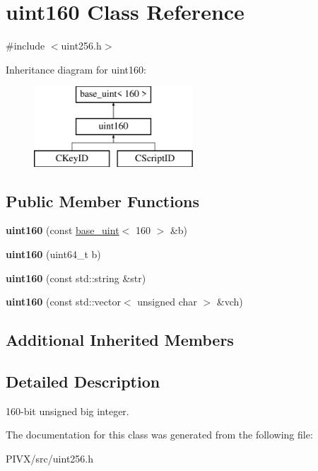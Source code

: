 \hypertarget{classuint160}{}\section{uint160 Class Reference}
\label{classuint160}


{\ttfamily \#include $<$uint256.\+h$>$}

Inheritance diagram for uint160\+:\begin{figure}[H]
\begin{center}
\leavevmode
\includegraphics[height=3.000000cm]{classuint160}
\end{center}
\end{figure}
\subsection*{Public Member Functions}
\begin{DoxyCompactItemize}
\item 
\mbox{\label{classuint160_ae0ba03a9f6b06af48b44963b3d32c2bd}} 
{\bfseries uint160} (const \mbox{\hyperlink{classbase__uint}{base\+\_\+uint}}$<$ 160 $>$ \&b)
\item 
\mbox{\label{classuint160_a1b4399cc586066b0c61401921be5d041}} 
{\bfseries uint160} (uint64\+\_\+t b)
\item 
\mbox{\label{classuint160_a17be565c999f678e47d12e694446e0c4}} 
{\bfseries uint160} (const std\+::string \&str)
\item 
\mbox{\label{classuint160_a92bd85c77e73d6642f9bb7519cbd480c}} 
{\bfseries uint160} (const std\+::vector$<$ unsigned char $>$ \&vch)
\end{DoxyCompactItemize}
\subsection*{Additional Inherited Members}


\subsection{Detailed Description}
160-\/bit unsigned big integer. 

The documentation for this class was generated from the following file\+:\begin{DoxyCompactItemize}
\item 
P\+I\+V\+X/src/uint256.\+h\end{DoxyCompactItemize}
